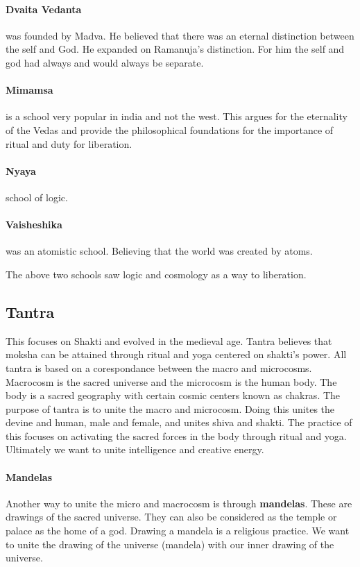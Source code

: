\documentclass{article}
\begin{document}
\paragraph{Dvaita Vedanta}
\label{par:dvaita_vedanta}
was founded by Madva. He believed that there was an eternal distinction between the self and God. He expanded on Ramanuja's distinction. For him the self and god had always and would always be separate.

\paragraph{Mimamsa}
\label{par:mimamsa}
is a school very popular in india and not the west. This argues for the eternality of the Vedas and provide the philosophical foundations for the importance of ritual and duty for liberation.

\paragraph{Nyaya}
\label{par:nyaya}
school of logic.

\paragraph{Vaisheshika}
\label{par:vaisheshika}
was an atomistic school. Believing that the world was created by atoms.

The above two schools saw logic and cosmology as a way to liberation.

\subsection*{Tantra}
\label{sec:tantra}
This focuses on Shakti and evolved in the medieval age. Tantra believes that moksha can be attained through ritual and yoga centered on shakti's power. All tantra is based on a corespondance between the macro and microcosms. Macrocosm is the sacred universe and the microcosm is the human body. The body is a sacred geography with certain cosmic centers known as chakras. The purpose of tantra is to unite the macro and microcosm. Doing this unites the devine and human, male and female, and unites shiva and shakti. The practice of this focuses on activating the sacred forces in the body through ritual and yoga. Ultimately we want to unite intelligence and creative energy.

\paragraph{Mandelas}
\label{par:mandelas}
Another way to unite the micro and macrocosm is through \textbf{mandelas}. These are drawings of the sacred universe. They can also be considered as the temple or palace as the home of a god. Drawing a mandela is a religious practice. We want to unite the drawing of the universe (mandela) with our inner drawing of the universe.
\end{document}

